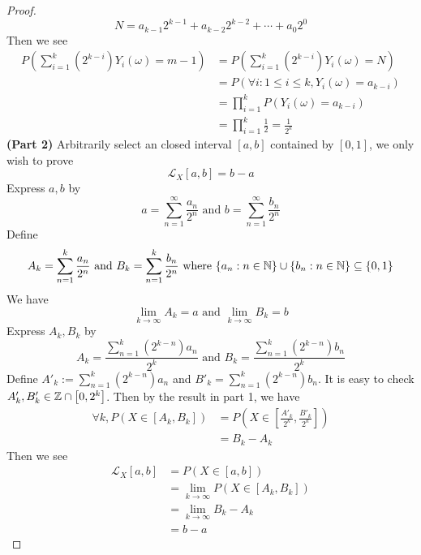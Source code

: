 \documentclass{report}
\begin{document}
\begin{proof}
\begin{equation*}
N=a_{k-1}2^{k-1}+a_{k-2}2^{k-2}+\cdots + a_{0}2^0
\end{equation*}
Then we see 
\begin{align*}
P\left( \sum_{i=1}^k \left(2^{k-i} \right)Y_i\left(\omega \right) =m-1\right)&=P\left(  \sum_{i=1}^k \left(2^{k-i} \right)Y_i\left(\omega \right)=N \right)\\
&=P\left(\forall i:1\leq i\leq k, Y_i\left(\omega \right)=a_{k-i} \right)\\
&=\prod_{i=1}^k P\left(Y_i\left(\omega \right)=a_{k-i} \right)\\
&=\prod_{i=1}^k \frac{1}{2}=\frac{1}{2^k}
\end{align*}
\textbf{(Part 2)} Arbitrarily select an closed interval  $\left[a,b \right]$ contained by $\left[0,1 \right]$, we only wish to prove 
\begin{equation*}
\mathcal{L}_X \left[a,b \right]=b-a
\end{equation*}
Express $a,b$ by 
 \begin{equation*}
a=\sum_{n=1}^\infty \frac{a_n}{2^n}\text{ and }b=\sum_{n=1}^\infty \frac{b_n}{2^n}
\end{equation*}
Define
\begin{equation*}
A_k=\sum_{n=1}^k \frac{a_n}{2^n}\text{ and }B_k=\sum_{n=1}^k \frac{b_n}{2^n}\text{ where }\{ a_n:n\in\mathbb{N} \}\cup \{ b_n:n\in\mathbb{N} \}\subseteq \{ 0,1 \}
\end{equation*}
We have 
\begin{equation*}
\lim_{k\to\infty} A_k=a\text{ and }\lim_{k\to\infty}B_k=b
\end{equation*}
Express $A_k,B_k$ by 
\begin{equation*}
  A_k=\frac{\sum_{n=1}^k \left( 2^{k-n}\right)a_n}{2^k}\text{ and }B_k=\frac{\sum_{n=1}^k \left( 2^{k-n}\right)b_n}{2^k}
\end{equation*}
Define $A'_k:=\sum_{n=1}^k \left(2^{k-n} \right)a_n$ and $B'_k=\sum_{n=1}^k \left(2^{k-n} \right)b_n$. It is easy to check $A'_k,B'_k \in \mathbb{Z} \cap \left[0,2^k \right]$. Then by the result in part 1, we have
\begin{align*}
\forall k,P\left(X\in \left[A_k,B_k \right] \right)&=P\left(X \in \left[\frac{A'_k}{2^k},\frac{B'_k}{2^k} \right] \right)\\
&=B_k-A_k
\end{align*}
Then we see 
\begin{align*}
\mathcal{L}_X \left[a,b \right]&=P\left(X\in \left[a,b \right]\right)\\
&=\lim_{k\to\infty} P\left(X\in \left[A_k,B_k \right] \right)\\
&=\lim_{k\to\infty} B_k-A_k\\
&=b-a
\end{align*}




\end{proof}
\end{document}
